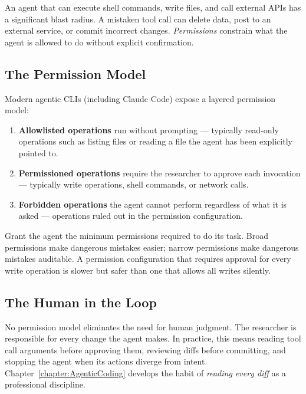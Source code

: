 An agent that can execute shell commands, write files, and call external APIs has a significant blast radius.
A mistaken tool call can delete data, post to an external service, or commit incorrect changes.
\emph{Permissions} constrain what the agent is allowed to do without explicit confirmation.

\subsection{The Permission Model}

Modern agentic CLIs (including Claude Code) expose a layered permission model:
\begin{enumerate}
\item \textbf{Allowlisted operations} run without prompting — typically read-only operations such as listing files or reading a file the agent has been explicitly pointed to.
\item \textbf{Permissioned operations} require the researcher to approve each invocation — typically write operations, shell commands, or network calls.
\item \textbf{Forbidden operations} the agent cannot perform regardless of what it is asked — operations ruled out in the permission configuration.
\end{enumerate}

\begin{principle}
\label{principle:LeastPrivilege}
Grant the agent the minimum permissions required to do its task.
Broad permissions make dangerous mistakes easier; narrow permissions make dangerous mistakes auditable.
A permission configuration that requires approval for every write operation is slower but safer than one that allows all writes silently.
\end{principle}

\subsection{The Human in the Loop}

No permission model eliminates the need for human judgment.
The researcher is responsible for every change the agent makes.
In practice, this means reading tool call arguments before approving them, reviewing diffs before committing, and stopping the agent when its actions diverge from intent.
Chapter~\ref{chapter:AgenticCoding} develops the habit of \emph{reading every diff} as a professional discipline.

